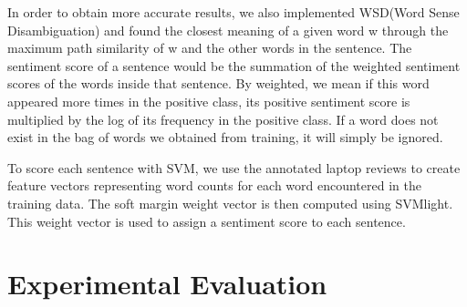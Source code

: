 \documentclass{article}
\begin{document}
In order to obtain more accurate results, we also implemented WSD(Word Sense Disambiguation) and found the closest meaning of a given word w through the maximum path similarity of w and the other words in the sentence. The sentiment score of a sentence would be the summation of the weighted sentiment scores of the words inside that sentence. By weighted, we mean if this word appeared more times in the positive class, its positive sentiment score is multiplied by the log of its frequency in the positive class. If a word does not exist in the bag of words we obtained from training, it will simply be ignored.

To score each sentence with SVM, we use the annotated laptop reviews to create feature vectors representing word counts for each word encountered in the training data. The soft margin weight vector is then computed using SVMlight. This weight vector is used to assign a sentiment score to each sentence. 

\section{Experimental Evaluation} 
\end{document}
